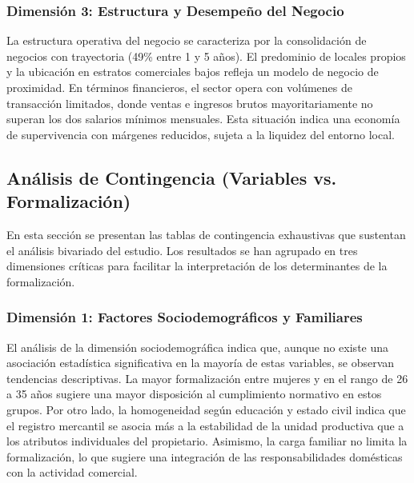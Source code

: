\documentclass[11pt,a4paper]{article}
\begin{document}
\subsubsection{Dimensión 3: Estructura y Desempeño del Negocio}




\par
La estructura operativa del negocio se caracteriza por la consolidación de negocios con trayectoria (49\% entre 1 y 5 años). El predominio de locales propios y la ubicación en estratos comerciales bajos refleja un modelo de negocio de proximidad. En términos financieros, el sector opera con volúmenes de transacción limitados, donde ventas e ingresos brutos mayoritariamente no superan los dos salarios mínimos mensuales. Esta situación indica una economía de supervivencia con márgenes reducidos, sujeta a la liquidez del entorno local.
\par
\subsection{Análisis de Contingencia (Variables vs. Formalización)}
En esta sección se presentan las tablas de contingencia exhaustivas que sustentan el análisis bivariado del estudio. Los resultados se han agrupado en tres dimensiones críticas para facilitar la interpretación de los determinantes de la formalización.

\subsubsection{Dimensión 1: Factores Sociodemográficos y Familiares}





\par
El análisis de la dimensión sociodemográfica indica que, aunque no existe una asociación estadística significativa en la mayoría de estas variables, se observan tendencias descriptivas. La mayor formalización entre mujeres y en el rango de 26 a 35 años sugiere una mayor disposición al cumplimiento normativo en estos grupos. Por otro lado, la homogeneidad según educación y estado civil indica que el registro mercantil se asocia más a la estabilidad de la unidad productiva que a los atributos individuales del propietario. Asimismo, la carga familiar no limita la formalización, lo que sugiere una integración de las responsabilidades domésticas con la actividad comercial.
\end{document}
